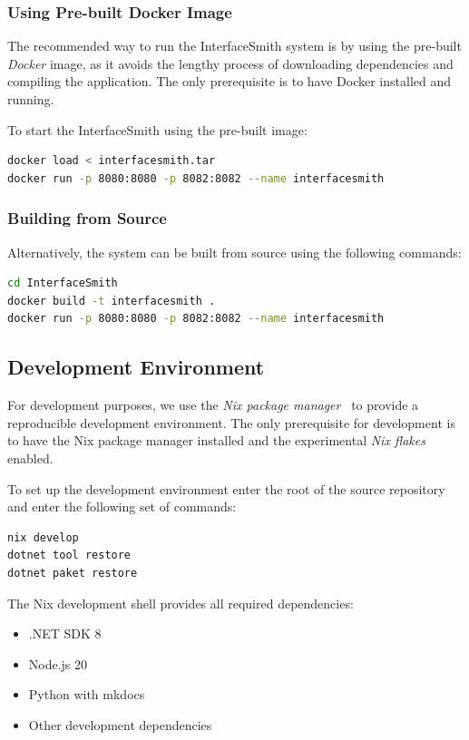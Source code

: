 \subsubsection{Using Pre-built Docker Image}

The recommended way to run the InterfaceSmith system is by using the pre-built \emph{Docker} image, as it avoids the lengthy process of downloading dependencies and compiling the application.
The only prerequisite is to have Docker installed and running.

To start the InterfaceSmith using the pre-built image:
\begin{lstlisting}[language=bash]
docker load < interfacesmith.tar
docker run -p 8080:8080 -p 8082:8082 --name interfacesmith 
\end{lstlisting}

\subsubsection{Building from Source}

Alternatively, the system can be built from source using the following commands:
\begin{lstlisting}[language=bash]
cd InterfaceSmith
docker build -t interfacesmith .
docker run -p 8080:8080 -p 8082:8082 --name interfacesmith
\end{lstlisting}


\medskip
\subsection{Development Environment}

For development purposes, we use the \emph{Nix package manager}~\cite{Nix} to provide a reproducible development environment. The only prerequisite for development is to have the
Nix package manager installed and the experimental \emph{Nix flakes} enabled.

To set up the development environment enter the root of the source repository and enter the following set of commands:
\begin{lstlisting}[language=bash]
nix develop
dotnet tool restore
dotnet paket restore
\end{lstlisting}

\noindent The Nix development shell provides all required dependencies:
\begin{itemize}
	\item .NET SDK 8
	\item Node.js 20
	\item Python with mkdocs
	\item Other development dependencies
\end{itemize}

